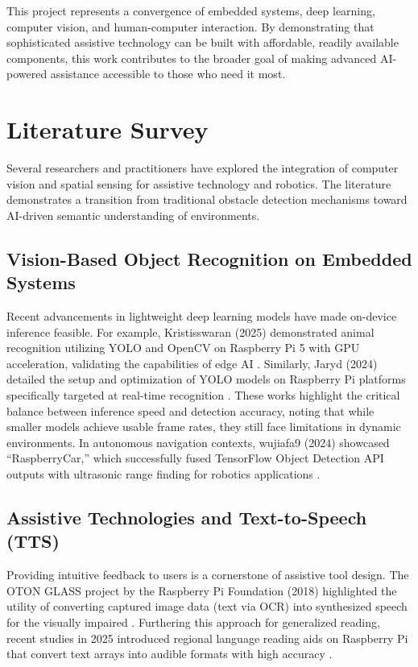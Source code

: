 \documentclass[conference]{IEEEtran}
\begin{document}
This project represents a convergence of embedded systems, deep learning, computer vision, and human-computer interaction. By demonstrating that sophisticated assistive technology can be built with affordable, readily available components, this work contributes to the broader goal of making advanced AI-powered assistance accessible to those who need it most.

\section{Literature Survey}
Several researchers and practitioners have explored the integration of computer vision and spatial sensing for assistive technology and robotics. The literature demonstrates a transition from traditional obstacle detection mechanisms toward AI-driven semantic understanding of environments.

\subsection{Vision-Based Object Recognition on Embedded Systems}
Recent advancements in lightweight deep learning models have made on-device inference feasible. For example, Kristisswaran (2025) demonstrated animal recognition utilizing YOLO and OpenCV on Raspberry Pi 5 with GPU acceleration, validating the capabilities of edge AI \cite{b3}. Similarly, Jaryd (2024) detailed the setup and optimization of YOLO models on Raspberry Pi platforms specifically targeted at real-time recognition \cite{b8}. These works highlight the critical balance between inference speed and detection accuracy, noting that while smaller models achieve usable frame rates, they still face limitations in dynamic environments. In autonomous navigation contexts, wujiafa9 (2024) showcased ``RaspberryCar,'' which successfully fused TensorFlow Object Detection API outputs with ultrasonic range finding for robotics applications \cite{b2}.

\subsection{Assistive Technologies and Text-to-Speech (TTS)}
Providing intuitive feedback to users is a cornerstone of assistive tool design. The OTON GLASS project by the Raspberry Pi Foundation (2018) highlighted the utility of converting captured image data (text via OCR) into synthesized speech for the visually impaired \cite{b4}. Furthering this approach for generalized reading, recent studies in 2025 introduced regional language reading aids on Raspberry Pi that convert text arrays into audible formats with high accuracy \cite{b9}.
\end{document}
